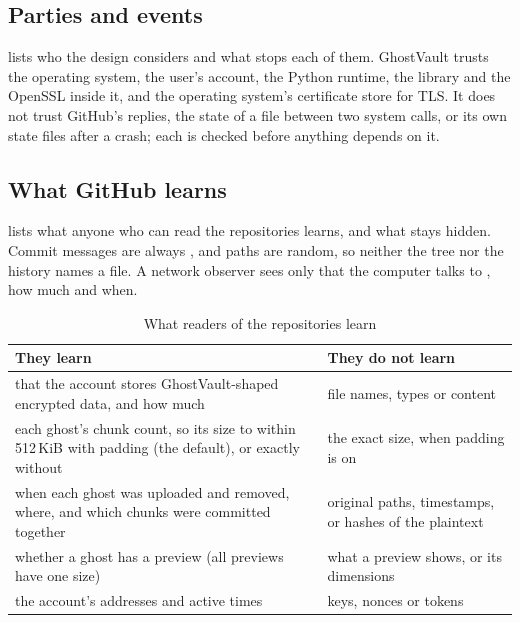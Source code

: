 \subsection{Parties and events}
 lists who the design considers and what stops each of them. GhostVault
trusts the operating system, the user's account, the Python runtime, the 
library and the OpenSSL inside it, and the operating system's certificate store for TLS. It does
not trust GitHub's replies, the state of a file between two system calls, or its own state files
after a crash; each is checked before anything depends on it.

\subsection{What GitHub learns}\label{sec:learn}
 lists what anyone who can read the repositories learns, and what stays hidden.
Commit messages are always , and paths are random, so neither the tree nor the history
names a file. A network observer sees only that the computer talks to , how
much and when.

\begin{table}[t]
\caption{What readers of the repositories learn}\label{tab:learn}
\centering\footnotesize
\begin{tabular}{@{}L{40mm}L{40mm}@{}}
\toprule
\textbf{They learn} & \textbf{They do not learn} \\
\midrule
that the account stores GhostVault-shaped encrypted data, and how much & file names, types or
content \\ \addlinespace[1.6pt]
each ghost's chunk count, so its size to within 512\,KiB with padding (the default), or exactly
without & the exact size, when padding is on \\ \addlinespace[1.6pt]
when each ghost was uploaded and removed, where, and which chunks were committed together &
original paths, timestamps, or hashes of the plaintext \\ \addlinespace[1.6pt]
whether a ghost has a preview (all previews have one size) & what a preview shows, or its
dimensions \\ \addlinespace[1.6pt]
the account's addresses and active times & keys, nonces or tokens \\
\bottomrule
\end{tabular}
\end{table}

